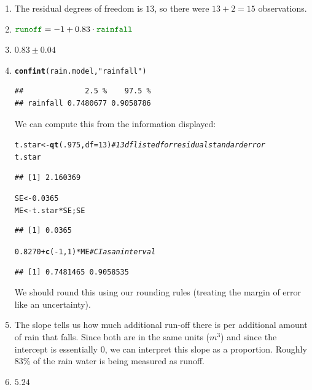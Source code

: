 \documentclass[twoside]{book}
\makeatletter
\newcommand{\hlnum}[1]{\textcolor[rgb]{0.686,0.059,0.569}{#1}}%
\newcommand{\hlstr}[1]{\textcolor[rgb]{0.192,0.494,0.8}{#1}}%
\newcommand{\hlcom}[1]{\textcolor[rgb]{0.678,0.584,0.686}{\textit{#1}}}%
\newcommand{\hlopt}[1]{\textcolor[rgb]{0,0,0}{#1}}%
\newcommand{\hlstd}[1]{\textcolor[rgb]{0.345,0.345,0.345}{#1}}%
\newcommand{\hlkwb}[1]{\textcolor[rgb]{0.69,0.353,0.396}{#1}}%
\newcommand{\hlkwc}[1]{\textcolor[rgb]{0.333,0.667,0.333}{#1}}%
\newcommand{\hlkwd}[1]{\textcolor[rgb]{0.737,0.353,0.396}{\textbf{#1}}}%
\newenvironment{kframe}{%
 \def\at@end@of@kframe{}%
 \ifinner\ifhmode%
  \def\at@end@of@kframe{\end{minipage}}%
  \begin{minipage}{\columnwidth}%
 \fi\fi%
 \def\FrameCommand##1{\hskip\@totalleftmargin \hskip-\fboxsep
 \colorbox{shadecolor}{##1}\hskip-\fboxsep
     \hskip-\linewidth \hskip-\@totalleftmargin \hskip\columnwidth}%
 \MakeFramed {\advance\hsize-\width
   \@totalleftmargin\z@ \linewidth\hsize
   \@setminipage}}%
 {\par\unskip\endMakeFramed%
 \at@end@of@kframe}
\newenvironment{knitrout}{}{} %
\newcommand{\variable}[1]{{\color{green!50!black}\texttt{#1}}}
\makeatother
\begin{document}
\begin{solution}
	\begin{enumerate}
		\item
			The residual degrees of freedom is $13$, so there were $13 + 2 = 15$
			observations.
\item
	$\variable{runoff} = -1  + 0.83 \cdot \variable{rainfall}$
\item
	$0.83 \pm 0.04$
\item
\begin{knitrout}
\color{fgcolor}\begin{kframe}
\begin{alltt}
\hlkwd{confint}\hlstd{(rain.model,} \hlstr{"rainfall"}\hlstd{)}
\end{alltt}
\begin{verbatim}
##              2.5 %    97.5 %
## rainfall 0.7480677 0.9058786
\end{verbatim}
\end{kframe}
\end{knitrout}
	We can compute this from the information displayed:
\begin{knitrout}
\color{fgcolor}\begin{kframe}
\begin{alltt}
\hlstd{t.star} \hlkwb{<-} \hlkwd{qt}\hlstd{(} \hlnum{.975}\hlstd{,} \hlkwc{df}\hlstd{=}\hlnum{13} \hlstd{)} \hlcom{# 13 df listed for residual standard error}
\hlstd{t.star}
\end{alltt}
\begin{verbatim}
## [1] 2.160369
\end{verbatim}
\begin{alltt}
\hlstd{SE} \hlkwb{<-} \hlnum{0.0365}
\hlstd{ME} \hlkwb{<-} \hlstd{t.star} \hlopt{*} \hlstd{SE; SE}
\end{alltt}
\begin{verbatim}
## [1] 0.0365
\end{verbatim}
\begin{alltt}
\hlnum{0.8270} \hlopt{+} \hlkwd{c}\hlstd{(}\hlopt{-}\hlnum{1}\hlstd{,}\hlnum{1}\hlstd{)} \hlopt{*} \hlstd{ME}  \hlcom{# CI as an interval}
\end{alltt}
\begin{verbatim}
## [1] 0.7481465 0.9058535
\end{verbatim}
\end{kframe}
\end{knitrout}
We should round this using our rounding rules (treating the margin of error
like an uncertainty).
\item
	The slope tells us how much additional run-off there is per additional
	amount of rain that falls.  Since both are in the same units ($m^3$) and
	since the intercept is essentially 0, we can interpret this slope as a
	proportion.  Roughly 83\% of the rain water is being measured as runoff. 
\item
	$5.24$
	\end{enumerate}
\end{solution}
\end{document}
